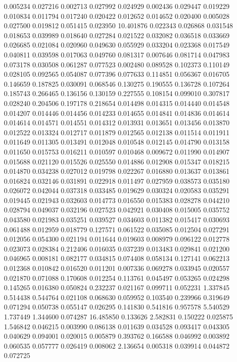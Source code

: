 0.005234
0.027216
0.002713
0.027992
0.024929
0.002436
0.029447
0.019229
0.010834
0.011794
0.017240
0.020422
0.012652
0.014652
0.020400
0.005028
0.027500
0.019812
0.051415
0.023950
10.401876
0.022343
0.026868
0.031548
0.018653
0.039989
0.018640
0.027284
0.021522
0.032082
0.036518
0.033669
0.026685
0.021084
0.020960
0.049630
0.055929
0.033204
0.023368
0.017549
0.040811
0.039598
0.017063
0.049760
0.081317
0.007646
0.081714
0.047983
0.073178
0.030508
0.061287
0.077523
0.002480
0.089528
0.102373
0.110149
0.028105
0.092565
0.054087
0.077396
0.077633
0.114851
0.056367
0.016705
0.146659
0.187825
0.030091
0.068546
0.130275
0.190555
0.136728
0.107264
0.185743
0.266465
0.136156
0.130159
0.227555
0.108154
0.099010
0.307817
0.028240
0.204506
0.197178
0.218654
0.014498
0.014315
0.014440
0.014548
0.014207
0.014446
0.014456
0.014233
0.014655
0.014841
0.014836
0.014614
0.014614
0.014571
0.014551
0.014312
0.013931
0.013651
0.013456
0.013870
0.012522
0.013324
0.012717
0.011879
0.012565
0.012138
0.011514
0.011911
0.011649
0.011305
0.013491
0.012048
0.010548
0.012145
0.014790
0.013158
0.011650
0.015753
0.016211
0.010597
0.010468
0.009672
0.011990
0.014907
0.015688
0.021120
0.015526
0.025550
0.014886
0.012908
0.015347
0.018215
0.014870
0.034238
0.027012
0.019798
0.022267
0.016880
0.013637
0.013861
0.016824
0.032146
0.031891
0.022918
0.011497
0.027959
0.038573
0.035180
0.026072
0.042044
0.037318
0.033485
0.019629
0.030324
0.020583
0.035291
0.019445
0.021943
0.032603
0.014773
0.016550
0.015383
0.028278
0.044210
0.028794
0.049037
0.032196
0.027523
0.042921
0.030408
0.015005
0.035752
0.043580
0.021983
0.035251
0.039527
0.034603
0.011382
0.015417
0.030693
0.061488
0.012959
0.018779
0.127571
0.061522
0.035085
0.012504
0.027291
0.012056
0.054300
0.021194
0.011644
0.019603
0.008979
0.096122
0.012778
0.023073
0.028384
0.212406
0.016035
0.037239
0.013483
0.029841
0.021200
0.046965
0.008181
0.082177
0.034815
0.074408
0.058134
0.127141
0.062213
0.012368
0.010842
0.016520
0.011201
0.007336
0.069278
0.033945
0.020557
0.021870
0.071088
0.170608
0.012254
0.113761
0.045497
0.053265
0.024298
0.145265
0.016380
0.050824
0.232237
0.021167
0.099711
0.052231
1.337845
0.514438
0.544764
0.021108
0.068630
0.059952
0.103540
0.239966
0.319649
0.071294
0.050738
0.055147
0.026295
0.141830
0.541816
0.957578
5.540529
1.737449
1.344600
0.074287
16.485850
0.133626
2.582831
0.150222
0.025875
1.546842
0.046215
0.003990
0.086138
0.011639
0.034528
0.093417
0.043305
0.040629
0.094001
0.020015
0.005879
0.393762
0.166588
0.046992
0.003892
0.060535
0.057777
0.026419
0.008062
2.136654
0.005318
0.039914
0.044872
0.072725
